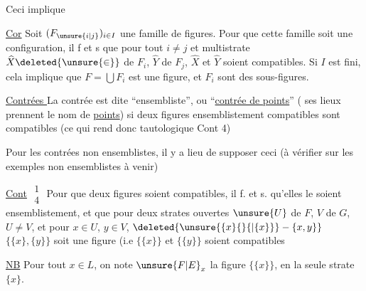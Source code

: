 
\deleted{\uline{\unsure{Cor}} Si $F,G,H$ sont \unsure{. tout|. trois} $(\unsure{F_i|F_j}\unsure{]|)}$}

 Ceci implique

\uline{Cor} Soit $(F_{\unsure{i|j}})_{i\in I}$ une famille  de figures. Pour que  cette famille soit une configuration, il f et s que pour tout $i\ne j$ et  multistrate $\widehat{X}\deleted{\unsure{\in}}$ de $F_i$, $\widehat{Y}$ de $F_j$, $\widehat{X}$ et $\widehat{Y}$ soient compatibles. Si $I$ est fini, cela implique que $F=\bigcup F_i$ est une figure, et  $F_i$  sont des sous-figures.


\uline{Contrées } La contrée est dite ``ensembliste'', ou ``\uline{contrée de points}'' ( ses lieux prennent le nom de \uline{points}) si deux figures ensemblistement compatibles sont compatibles (ce qui rend donc tautologique Cont 4) 

Pour les contrées non ensemblistes, il y a lieu de supposer ceci (à vérifier sur les exemples non ensemblistes à venir)

\uline{Cont} $\substack{1\\4}$ Pour que deux figures  soient \margin{\rule{0.35pt}{4.5\baselineskip}}compatibles, il f. et s. qu'elles le soient ensemblistement, et que pour deux  strates ouvertes $\unsure{U}$ de $F$, $V$ de $G$, $U\ne V$,  et pour  $x\in U$, $y\in V$, $\deleted{\unsure{\{x\}\{\}\{|\{x\}\}}-\{x,y\}}$ $\{\{x\},\{y\}\}$ soit une figure (i.e $\{\{x\}\}$ et $\{\{y\}\}$ soient compatibles


\uline{NB} Pour tout $x\in L$, on note $\unsure{F|E}_x$ la figure $\{\{x\}\}$,  en la seule strate $\{x\}$.

